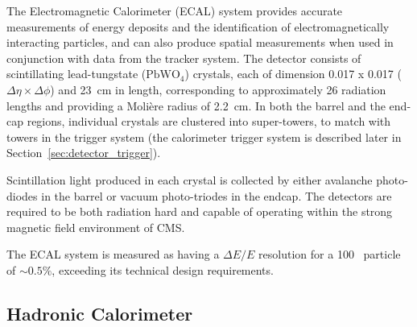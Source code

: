 

The Electromagnetic Calorimeter (ECAL) system provides accurate measurements of 
energy deposits and the identification of electromagnetically interacting 
particles, and can also produce spatial measurements when used in conjunction 
with data from the tracker system. The detector consists of scintillating
lead-tungstate
($\text{PbWO}_4$) crystals, each of dimension 0.017 x 0.017 ($\Delta \eta \times
\Delta \phi$) and 23~cm in length, corresponding to approximately 26 radiation
lengths
and providing a Moli\`{e}re radius of 2.2~cm. In both the barrel and the
end-cap regions, individual crystals are clustered into super-towers, to match
with towers in the trigger system (the calorimeter trigger system is described
later in Section~\ref{sec:detector_trigger}).

Scintillation light produced in each crystal is collected by either
avalanche photo-diodes in the barrel or vacuum photo-triodes in the
endcap. The detectors are required to be both radiation hard and capable of
operating within the strong magnetic field environment of CMS.

The ECAL system is measured as having a $\Delta E/E$ resolution for a 100~\gev
particle of $\sim 0.5\%$, exceeding its technical design requirements.

\subsection{Hadronic Calorimeter}



